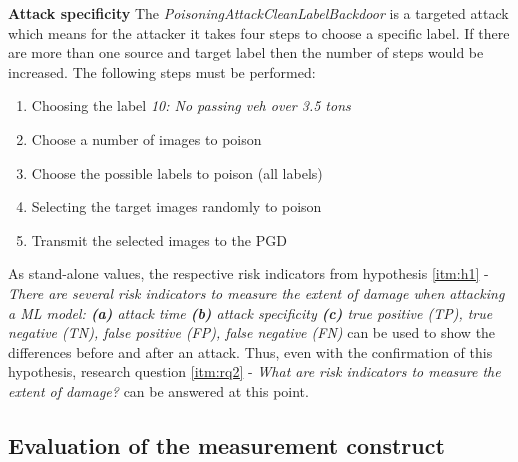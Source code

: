 \noindent\textbf{Attack specificity} The \textit{PoisoningAttackCleanLabelBackdoor} is a targeted attack which means for the attacker it takes four steps to choose a specific label. If there are more than one source and target label then the number of steps would be increased. The following steps must be performed:

\begin{enumerate}
  \item Choosing the label \textit{10: No passing veh over 3.5 tons}
  \item Choose a number of images to poison
  \item Choose the possible labels to poison (all labels)
  \item Selecting the target images randomly to poison
  \item Transmit the selected images to the PGD
\end{enumerate}

As stand-alone values, the respective risk indicators from hypothesis \ref{itm:h1} - \textit{There are several risk indicators to measure the extent of damage when attacking a ML model: \textbf{(a)} attack time \textbf{(b)} attack specificity \textbf{(c)} true positive (TP), true negative (TN), false positive (FP), false negative (FN)} can be used to show the differences before and after an attack. Thus, even with the confirmation of this hypothesis, research question \ref{itm:rq2} - \textit{What are risk indicators to measure the extent of damage?} can be answered at this point.
\subsection{Evaluation of the measurement construct}

